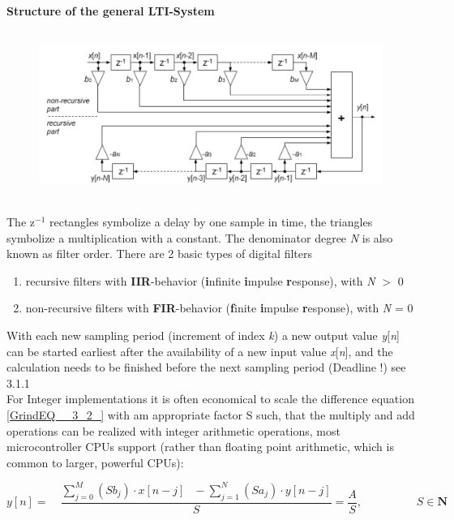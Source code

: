 {\rot\bf Structure of the general LTI-System}

    \begin{figure}[h]
    \centering
    \includegraphics[width=14cm, height=5.5cm]{Images/image143.png}
    \label{fig:Fig }
    \end{figure}

The z${}^{-1}$ rectangles symbolize a delay by one sample in time, the triangles symbolize a multiplication with a constant. The denominator degree \textit{N} is also known as filter order. There are 2 basic types of digital filters 

\begin{enumerate}
\item  recursive filters with \textbf{IIR}-behavior (\textbf{i}nfinite \textbf{i}mpulse \textbf{r}esponse), with \textit{N} $\mathrm{>}$ 0

\item  non-recursive filters with \textbf{FIR}-behavior (\textbf{f}inite \textbf{i}mpulse \textbf{r}esponse), with \textit{N} = 0
\end{enumerate}

With each new sampling period (increment of index \textit{k}) a new output value \textit{y}[\textit{n}] can be started earliest after the availability of a new input value \textit{x}[\textit{n}], and the calculation needs to be finished before the next sampling period (Deadline !)  see 3.1.1\\

For Integer implementations it is often economical to scale the difference equation \eqref{GrindEQ__3_2_} with am appropriate factor S such, that the multiply and add operations can be realized with integer arithmetic operations, most microcontroller CPUs support (rather than floating point arithmetic, which is common to larger, powerful CPUs):

\begin{equation}
	y[n]=\quad \frac{\sum _{j=0}^{M}(Sb_{j} )\cdot x[n-j] \; \; \, -\sum _{j=1}^{N}(Sa_{j} )\cdot y[n-j] }{S} =\frac{A}{S}   ,  \hspace{2cm}  \textit{S} \in \textbf{N}
\label{EQ }
\end{equation}

